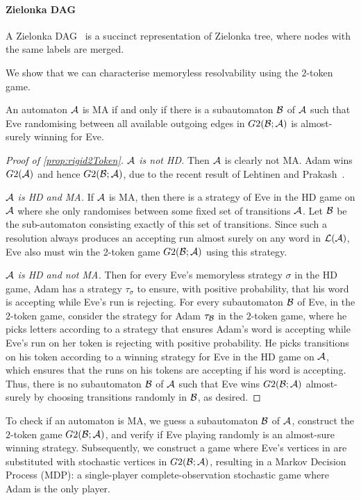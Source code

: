 \paragraph*{Zielonka DAG} A Zielonka DAG~\cite{HD05} is a succinct representation of Zielonka tree, where nodes with the same labels are merged.

\noindent We show that we can characterise memoryless resolvability using the $2$-token game.
    \begin{lemma}\label{prop:rigid2Token}
        An automaton $\mathcal{A}$ is MA if and only if there is a subautomaton $\mathcal{B}$ of $\mathcal{A}$ such that Eve randomising between all available outgoing edges in $G2(\mathcal{B};\mathcal{A})$ is almost-surely winning for Eve.
    \end{lemma}
    \begin{proof}[Proof of \cref{prop:rigid2Token}]
        \emph{$\mathcal{A}$ is not HD.} Then $\mathcal{A}$ is clearly not MA.  Adam wins $G2(\mathcal{A})$ and hence $G2(\mathcal{B};\mathcal{A})$, due to the recent result of Lehtinen and Prakash~\cite[2-token theorem]{LP25}.
        
        \emph{$\mathcal{A}$ is HD and MA.} If $\mathcal{A}$ is MA, then there is a strategy of Eve in the HD game on $\mathcal{A}$ where she only randomises between some fixed set of transitions $\mathcal{A}$. Let $\mathcal{B}$ be the sub-automaton consisting exactly of this set of transitions.  Since such a resolution always produces an accepting run almost surely on any word in $\mathcal{L}(\mathcal{A})$, Eve also must win the 2-token game $G2(\mathcal{B};\mathcal{A})$ using this strategy. 
        
        \emph{$\mathcal{A}$ is HD and not MA.} Then for every Eve's memoryless strategy $\sigma$ in the HD game, Adam has a strategy $\tau_{\sigma}$ to ensure, with positive probability, that his word is accepting while Eve's run is rejecting. For every subautomaton $\mathcal{B}$ of Eve, in the $2$-token game, consider the strategy for Adam $\tau_{\mathcal{B}}$ in the $2$-token game, where he picks letters according to a strategy that ensures Adam's word is accepting while Eve's run on her token is rejecting with positive probability. He picks transitions on his token according to a winning strategy for Eve in the HD game on $\mathcal{A}$, which ensures that the runs on his tokens are accepting if his word is accepting. Thus, there is no subautomaton $\mathcal{B}$ of $\mathcal{A}$ such that Eve wins $G2(\mathcal{B};\mathcal{A})$ almost-surely by choosing transitions randomly in $\mathcal{B}$, as desired.  
    \end{proof}
    To check if an automaton is MA, we guess a subautomaton $\mathcal{B}$ of $\mathcal{A}$, construct the $2$-token game $G2(\mathcal{B};\mathcal{A})$, and verify if Eve playing randomly is an almost-sure winning strategy. Subsequently, we construct a game where Eve's vertices in are substituted with stochastic vertices in $G2(\mathcal{B};\mathcal{A})$, resulting in a Markov Decision Process (MDP): a single-player complete-observation stochastic game where Adam is the only player. 
    
